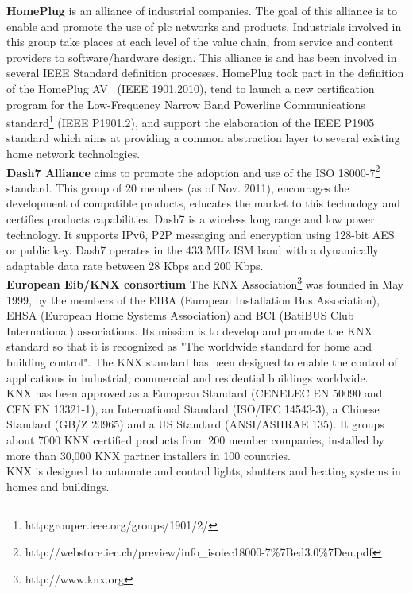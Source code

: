 {\bf HomePlug} is an alliance of industrial companies. The goal of this alliance is to enable and promote the use of \gls{plc} networks and products. Industrials involved in this group take places at each level of the value chain, from service and content providers to software/hardware design. This alliance is and has been involved in several IEEE Standard definition processes. HomePlug took part in the definition of the HomePlug AV~\cite{Alliance:2005} (IEEE 1901.2010), tend to launch a new certification program for the Low-Frequency Narrow Band Powerline Communications standard\footnote{http:grouper.ieee.org/groups/1901/2/} (IEEE P1901.2), and support the elaboration of the IEEE P1905 standard which aims at providing a common abstraction layer to several existing home network technologies.\\

{\bf Dash7 Alliance} aims to promote the adoption and use of the ISO 18000-7\footnote{http://webstore.iec.ch/preview/info\_isoiec18000-7\%7Bed3.0\%7Den.pdf} standard. This group of 20 members (as of Nov. 2011), encourages the development of compatible products, educates the market to this technology and certifies products capabilities. Dash7 is a wireless long range and low power technology. It supports IPv6, P2P messaging and encryption using 128-bit AES or public key. Dash7 operates in the 433 MHz ISM band with a dynamically adaptable data rate between 28 Kbps and 200 Kbps.\\

{\bf European Eib/KNX consortium} The KNX Association\footnote{http://www.knx.org} was founded in May 1999, by the members of the EIBA (European Installation Bus Association), EHSA (European Home Systems Association) and BCI (BatiBUS Club International) associations. Its mission is to develop and promote the KNX standard so that it is recognized as "The worldwide standard for home and building control". The KNX standard has been designed to enable the control of applications in industrial, commercial and residential buildings worldwide.\\
KNX has been approved as a European Standard (CENELEC EN 50090 and CEN EN 13321-1), an International Standard (ISO/IEC 14543-3), a Chinese Standard (GB/Z 20965) and a US Standard (ANSI/ASHRAE 135). It groups about 7000 KNX certified products from 200 member companies, installed by more than 30,000 KNX partner installers in 100 countries.\\
KNX is designed to automate and control lights, shutters and heating systems in homes and buildings.\\

